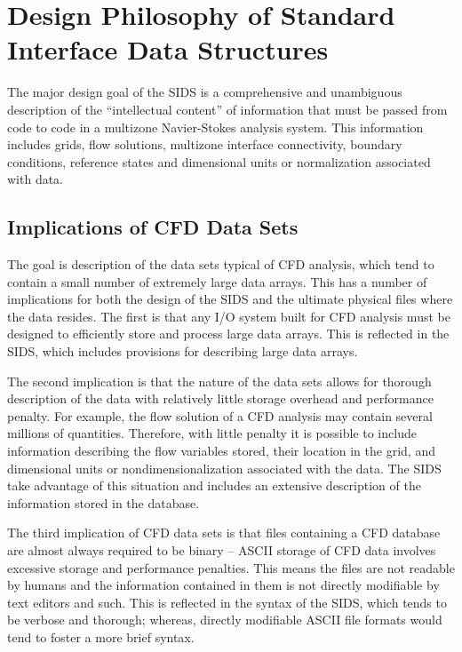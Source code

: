 \section{Design Philosophy of Standard Interface Data Structures}
\label{s:design}
\thispagestyle{plain}

The major design goal of the SIDS is a comprehensive and unambiguous
description of the ``intellectual content'' of information that must be
passed from code to code in a multizone Navier-Stokes analysis system.
This information includes grids, flow solutions, multizone interface
connectivity, boundary conditions, reference states and dimensional
units or normalization associated with data.

\subsection{Implications of CFD Data Sets}

The goal is description of the data sets typical of CFD analysis, which
tend to contain a small number of extremely large data arrays.  This
has a number of implications for both the design of the SIDS and the
ultimate physical files where the data resides.  The first is that any
I/O system built for CFD analysis must be designed to efficiently store
and process large data arrays.  This is reflected in the SIDS, which
includes provisions for describing large data arrays.

The second implication is that the nature of the data sets allows
for thorough description of the data with relatively little storage
overhead and performance penalty.  For example, the flow solution of a
CFD analysis may contain several millions of quantities.  Therefore,
with little penalty it is possible to include information describing
the flow variables stored, their location in the grid, and dimensional
units or nondimensionalization associated with the data.  The SIDS take
advantage of this situation and includes an extensive description of the
information stored in the database.

The third implication of CFD data sets is that files containing a CFD
database are almost always required to be binary -- ASCII storage of
CFD data involves excessive storage and performance penalties.  This
means the files are not readable by humans and the information contained
in them is not directly modifiable by text editors and such.  This is
reflected in the syntax of the SIDS, which tends to be verbose and
thorough; whereas, directly modifiable ASCII file formats would tend to
foster a more brief syntax.

